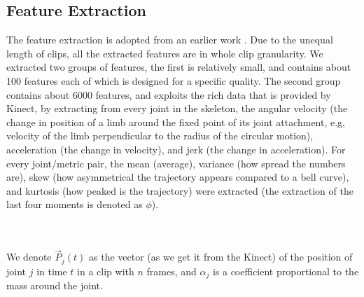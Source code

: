 \documentclass{sigchi}
\begin{document}
\subsection{Feature Extraction}
The feature extraction is adopted from an earlier work \cite{ran}.
Due to the unequal length of clips, all the extracted features are in whole clip 
granularity. We extracted two groups of features, the first is relatively
small, and contains about 100 features each of which is designed for a specific quality. The second group contains about 6000
features, and exploits the rich data that is provided by Kinect, by extracting from every joint in the skeleton, the angular velocity (the change in position of a limb around the fixed point of its joint attachment, e.g, velocity of the limb perpendicular to the radius of the circular motion), acceleration (the change in velocity), and jerk (the change in acceleration). For every joint/metric pair, the mean (average),
variance (how spread the numbers are), skew (how asymmetrical the trajectory appears compared to a bell curve), and kurtosis (how peaked is the trajectory) were extracted (the extraction of the last four
moments is denoted as $\phi$). 



\\\\We denote $\vec{P}_{j}(t)$ as the vector (as we get it from the Kinect) of
the position of joint $j$ in time $t$ in a clip with $n$ frames, and
$\alpha_{j}$ is a coefficient proportional to the mass around the joint. 
\end{document}
